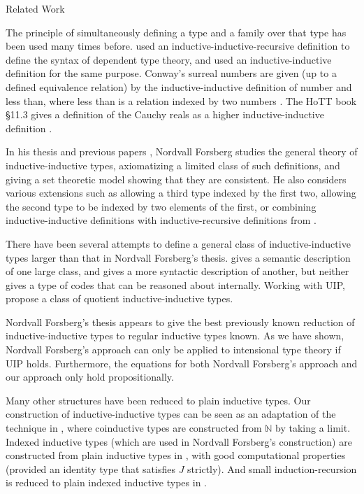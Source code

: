 \documentclass[runningheads]{llncs}
\newcommand{\N}{\mathbb{N}}
\def\Forsberg/{Nordvall Forsberg}
\begin{document}
\begin{section}{Related Work}

The principle of simultaneously defining a type and a family over that type has been used many times before. \citet{danielssonIRdeptype} used an inductive-inductive-recursive definition to define the syntax of dependent type theory, and \citet{CHAPMAN200921} used an inductive-inductive definition for the same purpose. Conway's surreal numbers \citep{conway2000numbers} are given (up to a defined equivalence relation) by the inductive-inductive definition of number and less than, where less than is a relation indexed by two numbers \citep[\S7.1]{nordvallforsberg2013thesis}. The HoTT book \S11.3 gives a definition of the Cauchy reals as a higher inductive-inductive definition \citep{hottbook}.

In his thesis and previous papers \citep{nordvallforsberg2013thesis,nordvallforsbergSetzer2010inductiveinductive,nordvallforsbergSetzer2012finIndind}, \Forsberg/ studies the general theory of inductive-inductive types, axiomatizing a limited class of such definitions, and giving a set theoretic model showing that they are consistent. He also considers various extensions such as allowing a third type indexed by the first two, allowing the second type to be indexed by two elements of the first, or combining inductive-inductive definitions with inductive-recursive definitions from \citet{finiteaxiomatizationIR}.

There have been several attempts to define a general class of inductive-inductive types larger than that in \Forsberg/'s thesis. \citet{Altenkirch2018QuotientITsemantics} gives a semantic description of one large class, and \citet{KaposiKovacsHIITsyntax} gives a more syntactic description of another, but neither gives a type of codes that can be reasoned about internally. Working with UIP, \citet{AltenkirchKaposiKovacsConstructingQIITs} propose a class of quotient inductive-inductive types.

\Forsberg/'s thesis \citep{nordvallforsberg2013thesis} appears to give the best previously known reduction of inductive-inductive types to regular inductive types known. As we have shown, \Forsberg/'s approach can only be applied to intensional type theory if UIP holds. Furthermore, the equations for both \Forsberg/'s approach and our approach only hold propositionally.

Many other structures have been reduced to plain inductive types. Our construction of inductive-inductive types can be seen as an adaptation of the technique in \citet{nonwellfoundedtrees}, where coinductive types are constructed from $\N$ by taking a limit. Indexed inductive types (which are used in \Forsberg/'s construction) are constructed from plain inductive types in \citet{altenkirch2015indexed}, with good computational properties (provided an identity type that satisfies $J$ strictly). And small induction-recursion is reduced to plain indexed inductive types in \citet{alti:tlca13-small-ir}.

\end{section}
\end{document}
